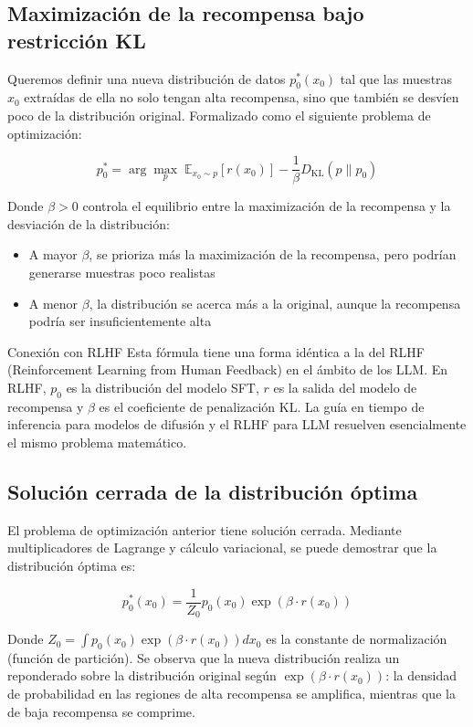 \documentclass[a4paper]{article}
\begin{document}
\subsection{Maximización de la recompensa bajo restricción KL}

Queremos definir una nueva distribución de datos $p_0^*(x_0)$ tal que las muestras $x_0$ extraídas de ella no solo tengan alta recompensa, sino que también se desvíen poco de la distribución original. Formalizado como el siguiente problema de optimización:

$$p_0^* = \arg\max_{p} \; \mathbb{E}_{x_0 \sim p}[r(x_0)] - \frac{1}{\beta} D_{\mathrm{KL}}(p \| p_0)$$

Donde $\beta > 0$ controla el equilibrio entre la maximización de la recompensa y la desviación de la distribución:
\begin{itemize}
    \item A mayor $\beta$, se prioriza más la maximización de la recompensa, pero podrían generarse muestras poco realistas
    \item A menor $\beta$, la distribución se acerca más a la original, aunque la recompensa podría ser insuficientemente alta
\end{itemize}

\begin{knowledgebox}{Conexión con RLHF}
Esta fórmula tiene una forma idéntica a la del RLHF (Reinforcement Learning from Human Feedback) en el ámbito de los LLM. En RLHF, $p_0$ es la distribución del modelo SFT, $r$ es la salida del modelo de recompensa y $\beta$ es el coeficiente de penalización KL. La guía en tiempo de inferencia para modelos de difusión y el RLHF para LLM resuelven esencialmente el mismo problema matemático.
\end{knowledgebox}

\subsection{Solución cerrada de la distribución óptima}

El problema de optimización anterior tiene solución cerrada. Mediante multiplicadores de Lagrange y cálculo variacional, se puede demostrar que la distribución óptima es:

$$p_0^*(x_0) = \frac{1}{Z_0} p_0(x_0) \exp(\beta \cdot r(x_0))$$

Donde $Z_0 = \int p_0(x_0) \exp(\beta \cdot r(x_0)) dx_0$ es la constante de normalización (función de partición). Se observa que la nueva distribución realiza un reponderado sobre la distribución original según $\exp(\beta \cdot r(x_0))$: la densidad de probabilidad en las regiones de alta recompensa se amplifica, mientras que la de baja recompensa se comprime.
\end{document}
